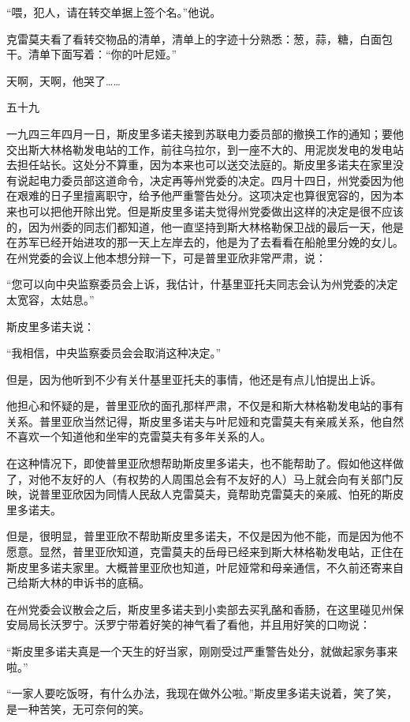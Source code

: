 “喂，犯人，请在转交单据上签个名。”他说。

克雷莫夫看了看转交物品的清单，清单上的字迹十分熟悉：葱，蒜，糖，白面包干。清单下面写着：“你的叶尼娅。”

天啊，天啊，他哭了……

五十九

一九四三年四月一日，斯皮里多诺夫接到苏联电力委员部的撤换工作的通知；要他交出斯大林格勒发电站的工作，前往乌拉尔，到一座不大的、用泥炭发电的发电站去担任站长。这处分不算重，因为本来也可以送交法庭的。斯皮里多诺夫在家里没有说起电力委员部这道命令，决定再等州党委的决定。四月十四日，州党委因为他在艰难的日子里擅离职守，给予他严重警告处分。这项决定也算很宽容的，因为本来也可以把他开除出党。但是斯皮里多诺夫觉得州党委做出这样的决定是很不应该的，因为州委的同志们都知道，他一直坚持到斯大林格勒保卫战的最后一天，他是在苏军已经开始进攻的那一天上左岸去的，他是为了去看看在船舱里分娩的女儿。在州党委的会议上他本想分辩一下，可是普里亚欣非常严肃，说：

“您可以向中央监察委员会上诉，我估计，什基里亚托夫同志会认为州党委的决定太宽容，太姑息。”

斯皮里多诺夫说：

“我相信，中央监察委员会会取消这种决定。”

但是，因为他听到不少有关什基里亚托夫的事情，他还是有点儿怕提出上诉。

他担心和怀疑的是，普里亚欣的面孔那样严肃，不仅是和斯大林格勒发电站的事有关系。普里亚欣当然记得，斯皮里多诺夫与叶尼娅和克雷莫夫有亲戚关系，他自然不喜欢一个知道他和坐牢的克雷莫夫有多年关系的人。

在这种情况下，即使普里亚欣想帮助斯皮里多诺夫，也不能帮助了。假如他这样做了，对他不友好的人（有权势的人周围总会有不友好的人）马上就会向有关部门反映，说普里亚欣因为同情人民敌人克雷莫夫，竟帮助克雷莫夫的亲戚、怕死的斯皮里多诺夫。

但是，很明显，普里亚欣不帮助斯皮里多诺夫，不仅是因为他不能，而是因为他不愿意。显然，普里亚欣知道，克雷莫夫的岳母已经来到斯大林格勒发电站，正住在斯皮里多诺夫家里。大概普里亚欣也知道，叶尼娅常和母亲通信，不久前还寄来自己给斯大林的申诉书的底稿。

在州党委会议散会之后，斯皮里多诺夫到小卖部去买乳酪和香肠，在这里碰见州保安局局长沃罗宁。沃罗宁带着好笑的神气看了看他，并且用好笑的口吻说：

“斯皮里多诺夫真是一个天生的好当家，刚刚受过严重警告处分，就做起家务事来啦。”

“一家人要吃饭呀，有什么办法，我现在做外公啦。”斯皮里多诺夫说着，笑了笑，是一种苦笑，无可奈何的笑。

